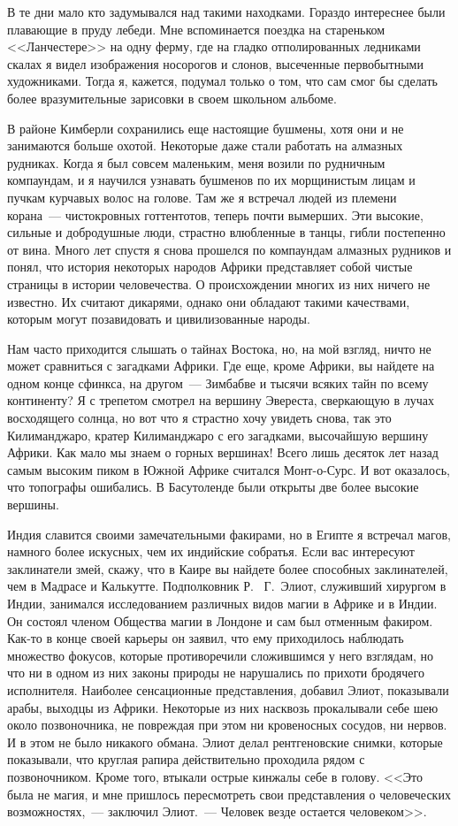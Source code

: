 \documentclass[12pt,a4paper,twoside,openany,svgnames]{memoir}
\begin{document}
В те дни мало кто задумывался над такими находками. Гораздо интереснее были плавающие в пруду лебеди. Мне вспоминается поездка на стареньком <<Ланчестере>> на одну ферму, где на гладко отполированных ледниками скалах я видел изображения носорогов и слонов, высеченные первобытными художниками. Тогда я, кажется, подумал только о том, что сам смог бы сделать более вразумительные зарисовки в своем школьном альбоме.

В районе Кимберли сохранились еще настоящие бушмены, хотя они и не занимаются больше охотой. Некоторые даже стали работать на алмазных рудниках. Когда я был совсем маленьким, меня возили по рудничным компаундам, и я научился узнавать бушменов по их морщинистым лицам и пучкам курчавых волос на голове. Там же я встречал людей из племени корана~--- чистокровных готтентотов, теперь почти вымерших. Эти высокие, сильные и добродушные люди, страстно влюбленные в танцы, гибли постепенно от вина. Много лет спустя я снова прошелся по компаундам алмазных рудников и понял, что история некоторых народов Африки представляет собой чистые страницы в истории человечества. О происхождении многих из них ничего не известно. Их считают дикарями, однако они обладают такими качествами, которым могут позавидовать и цивилизованные народы.

Нам часто приходится слышать о тайнах Востока, но, на мой взгляд, ничто не может сравниться с загадками Африки. Где еще, кроме Африки, вы найдете на одном конце сфинкса, на другом~--- Зимбабве и тысячи всяких тайн по всему континенту? Я с трепетом смотрел на вершину Эвереста, сверкающую в лучах восходящего солнца, но вот что я страстно хочу увидеть снова, так это Килиманджаро, кратер Килиманджаро с его загадками, высочайшую вершину Африки. Как мало мы знаем о горных вершинах! Всего лишь десяток лет назад самым высоким пиком в Южной Африке считался Монт-о-Сурс. И вот оказалось, что топографы ошибались. В Басутоленде были открыты две более высокие вершины.

Индия славится своими замечательными факирами, но в Египте я встречал магов, намного более искусных, чем их индийские собратья. Если вас интересуют заклинатели змей, скажу, что в Каире вы найдете более способных заклинателей, чем в Мадрасе и Калькутте. Подполковник
Р.~ Г.~Элиот, служивший хирургом в Индии, занимался исследованием различных видов магии в Африке и в Индии. Он состоял членом Общества магии в Лондоне и сам был отменным факиром. Как-то в конце своей карьеры он заявил, что ему приходилось наблюдать множество фокусов, которые противоречили сложившимся у него взглядам, но что ни в одном из них законы природы не нарушались по прихоти бродячего исполнителя. Наиболее сенсационные представления, добавил Элиот, показывали арабы, выходцы из Африки. Некоторые из них насквозь прокалывали себе шею около позвоночника, не повреждая при этом ни кровеносных сосудов, ни нервов. И в этом не было никакого обмана. Элиот делал рентгеновские снимки, которые показывали, что круглая рапира действительно проходила рядом с позвоночником. Кроме того, втыкали острые кинжалы себе в голову. <<Это была не магия, и мне пришлось пересмотреть свои представления о человеческих возможностях,~--- заключил Элиот.~--- Человек везде остается человеком>>.
\end{document}
